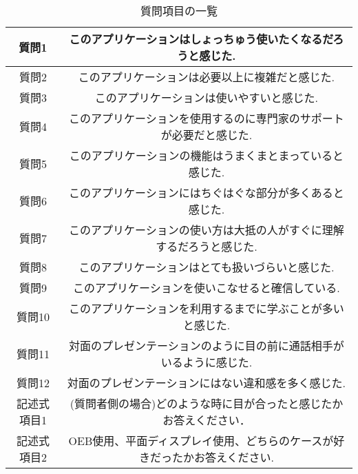 \begin{table}[tp]
  \begin{center}
  \begin{tabular}{|c|c|}
  \hline
  質問1   & このアプリケーションはしょっちゅう使いたくなるだろうと感じた.     \\ \hline
  質問2   & このアプリケーションは必要以上に複雑だと感じた.            \\ \hline
  質問3   & このアプリケーションは使いやすいと感じた.               \\ \hline
  質問4   & このアプリケーションを使用するのに専門家のサポートが必要だと感じた.  \\ \hline
  質問5   & このアプリケーションの機能はうまくまとまっていると感じた.       \\ \hline
  質問6   & このアプリケーションにはちぐはぐな部分が多くあると感じた.       \\ \hline
  質問7   & このアプリケーションの使い方は大抵の人がすぐに理解するだろうと感じた. \\ \hline
  質問8   & このアプリケーションはとても扱いづらいと感じた.            \\ \hline
  質問9   & このアプリケーションを使いこなせると確信している.           \\ \hline
  質問10  & このアプリケーションを利用するまでに学ぶことが多いと感じた.      \\ \hline
  質問11  & 対面のプレゼンテーションのように目の前に通話相手がいるように感じた.  \\ \hline
  質問12  & 対面のプレゼンテーションにはない違和感を多く感じた.          \\ \hline
  記述式項目1 & (質問者側の場合)どのような時に目が合ったと感じたかお答えください．  \\ \hline
  記述式項目2 & OEB使用、平面ディスプレイ使用、どちらのケースが好きだったかお答えください. \\ \hline
  \end{tabular}
  \caption{質問項目の一覧}\label{question}
  \end{center}
  \end{table}
